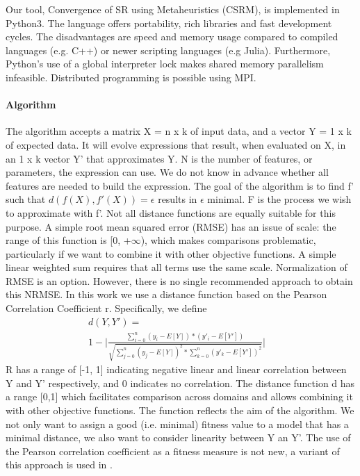 Our tool, Convergence of SR using Metaheuristics (CSRM), is implemented in Python3. The language offers portability, rich libraries and fast development cycles. The disadvantages are speed and memory usage compared to compiled languages (e.g. C++) or newer scripting languages (e.g Julia).
Furthermore, Python's use of a global interpreter lock makes shared memory parallelism infeasible. Distributed programming is possible using MPI.
\paragraph{Algorithm}
The algorithm accepts a matrix X = n x k of input data, and a vector Y = 1 x k of expected data. It will evolve expressions that result, when evaluated on X, in an 1 x k vector Y' that approximates Y. N is the number of features, or parameters, the expression can use. We do not know in advance whether all features are needed to build the expression.
The goal of the algorithm is to find f' such that $ d(f(X), f'(X))=\epsilon$ results in $\epsilon$ minimal. F is the process we wish to approximate with f'. Not all distance functions are equally suitable for this purpose. A simple root mean squared error (RMSE) has an issue of scale: the range of this function is [0, +$\infty$), which makes comparisons problematic, particularly if we want to combine it with other objective functions. A simple linear weighted sum requires that all terms use the same scale.
Normalization of RMSE is an option. However, there is no single recommended approach to obtain this NRMSE.
In this work we use a distance function based on the Pearson Correlation Coefficient r. Specifically, we define
\begin{equation}
\begin{aligned}
d(Y, Y') = & \\ 1 - 
 \lvert \frac{\sum_{i=0}^{n}{(y_i-E[Y])*(y'_i-E[Y'])}}{\sqrt{\sum_{j=0}^{n}{(y_j-E[Y])^2}*\sum_{k=0}^{n}{(y'_k-E[Y'])^2}}}
\lvert 
\end{aligned}
\end{equation}
R has a range of [-1, 1] indicating negative linear and linear correlation between Y and Y' respectively, and 0 indicates no correlation. The distance function d has a range [0,1] which facilitates comparison across domains and allows combining it with other objective functions. The function reflects the aim of the algorithm. We not only want to assign a good (i.e. minimal) fitness value to a model that has a minimal distance, we also want to consider linearity between Y an Y'. The use of the Pearson correlation coefficient as a fitness measure is not new, a variant of this approach is used in \citep{pearson}.
